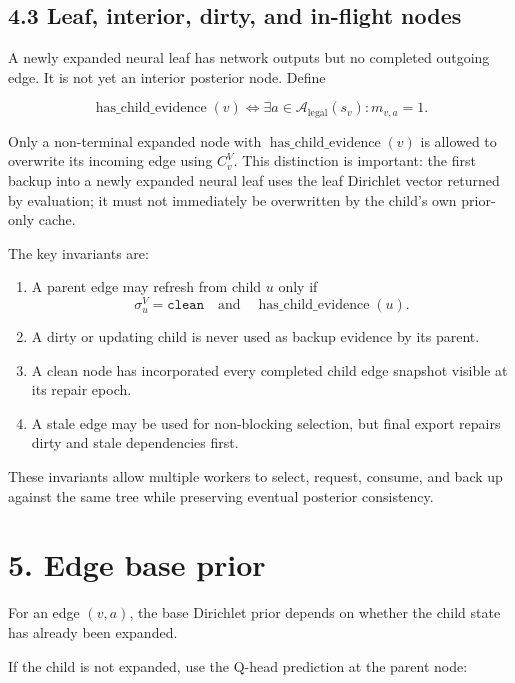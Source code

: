 \documentclass[11pt]{article}
\newcommand{\Legal}{\mathcal{A}_{\mathrm{legal}}}
\begin{document}
\subsection*{4.3 Leaf, interior, dirty, and in-flight nodes}

A newly expanded neural leaf has network outputs but no completed outgoing edge.
It is not yet an interior posterior node. Define

\[
\operatorname{has\_child\_evidence}(v)
\iff
\exists a\in\Legal(s_v):m_{v,a}=1.
\]

Only a non-terminal expanded node with
\(\operatorname{has\_child\_evidence}(v)\) is allowed to overwrite its incoming
edge using \(C^V_v\). This distinction is important: the first backup into a
newly expanded neural leaf uses the leaf Dirichlet vector returned by evaluation; it
must not immediately be overwritten by the child's own prior-only cache.

The key invariants are:

\begin{enumerate}[leftmargin=2em]
  \item A parent edge may refresh from child \(u\) only if
  \[
  \sigma^V_u=\texttt{clean}
  \quad\text{and}\quad
  \operatorname{has\_child\_evidence}(u).
  \]

  \item A dirty or updating child is never used as backup evidence by its
  parent.

  \item A clean node has incorporated every completed child edge snapshot visible
  at its repair epoch.

  \item A stale edge may be used for non-blocking selection, but final export
  repairs dirty and stale dependencies first.
\end{enumerate}

These invariants allow multiple workers to select, request, consume, and back up
against the same tree while preserving eventual posterior consistency.

\section*{5. Edge base prior}

For an edge \((v,a)\), the base Dirichlet prior depends on whether the child
state has already been expanded.

If the child is not expanded, use the Q-head prediction at the parent node:
\end{document}
